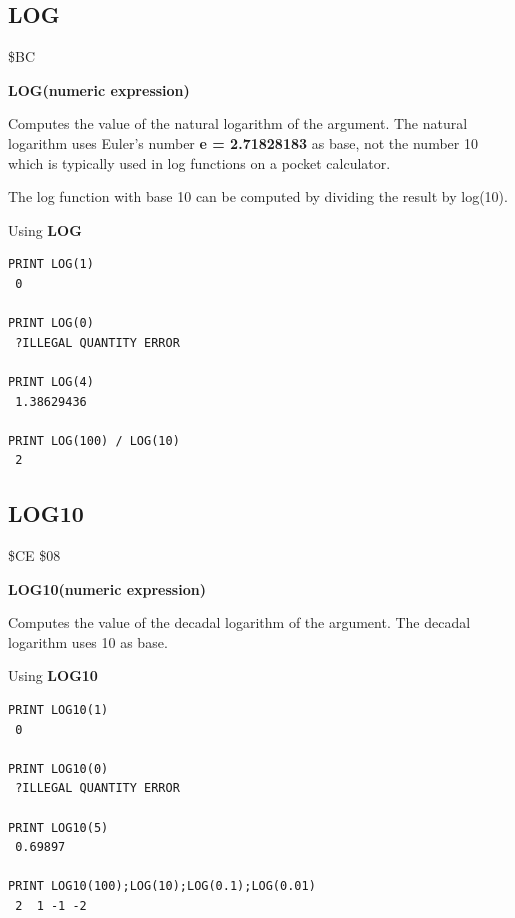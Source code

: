
\newpage
\subsection{LOG}
\begin{description}[leftmargin=2cm,style=nextline]
\item [Token:] \$BC
\item [Format:] {\bf LOG(numeric expression)}
\item [Usage:] Computes
               the value of the natural logarithm of the argument.
               The natural logarithm uses
               Euler's number {\bf e = 2.71828183} as base,
               not the number 10 which is typically used
               in log functions on a pocket calculator.

\item [Remarks:] The log function with base 10 can be computed
                 by dividing the result by log(10).
\item [Example:] Using {\bf LOG}
\begin{tcolorbox}[colback=black,coltext=white]
\verbatimfont{\codefont}
\begin{verbatim}
PRINT LOG(1)
 0

PRINT LOG(0)
 ?ILLEGAL QUANTITY ERROR

PRINT LOG(4)
 1.38629436

PRINT LOG(100) / LOG(10)
 2
\end{verbatim}
\end{tcolorbox}
\end{description}


\newpage
\subsection{LOG10}
\begin{description}[leftmargin=2cm,style=nextline]
\item [Token:] \$CE \$08
\item [Format:] {\bf LOG10(numeric expression)}
\item [Usage:] Computes
               the value of the decadal logarithm of the argument.
               The decadal logarithm uses 10 as base.

\item [Example:] Using {\bf LOG10}
\begin{tcolorbox}[colback=black,coltext=white]
\verbatimfont{\codefont}
\begin{verbatim}
PRINT LOG10(1)
 0

PRINT LOG10(0)
 ?ILLEGAL QUANTITY ERROR

PRINT LOG10(5)
 0.69897

PRINT LOG10(100);LOG(10);LOG(0.1);LOG(0.01)
 2  1 -1 -2
\end{verbatim}
\end{tcolorbox}
\end{description}

